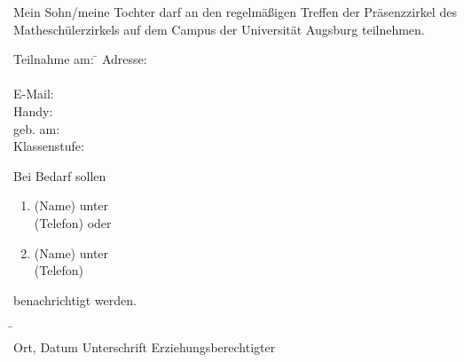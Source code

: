 \documentclass{mamazettel}
\begin{document}
\renewcommand{\datum}{9.11.2013}
\renewcommand{\betreff}{Anmeldung zum Matheschülerzirkel der Universität Augsburg}

\makeletterhead

Mein Sohn/meine Tochter \freist{} darf an den regelmäßigen Treffen der
Präsenzzirkel des Matheschülerzirkels auf dem Campus der Universität Augsburg
teilnehmen.

\doublespacing

\begin{tabbing}
  Teilnahme am: \= \kill
  Adresse: \> \freist \\
  \> \freist \\
  E-Mail: \> \freist \\
  Handy: \> \freist \\
  geb. am: \> \freist \\
  Klassenstufe: \> \freistKurz
\end{tabbing}

Bei Bedarf sollen
\begin{enumerate}
\item \freist{} (Name) unter \\ \freist{} (Telefon) oder
\item \freist{} (Name) unter \\ \freist{} (Telefon)
\end{enumerate}
benachrichtigt werden.

\begin{tabbing}
  \freistMittel \qquad\qquad \= \kill
  \freistMittel \> \freist \\
  Ort, Datum \> Unterschrift Erziehungsberechtigter
\end{tabbing}
\end{document}
